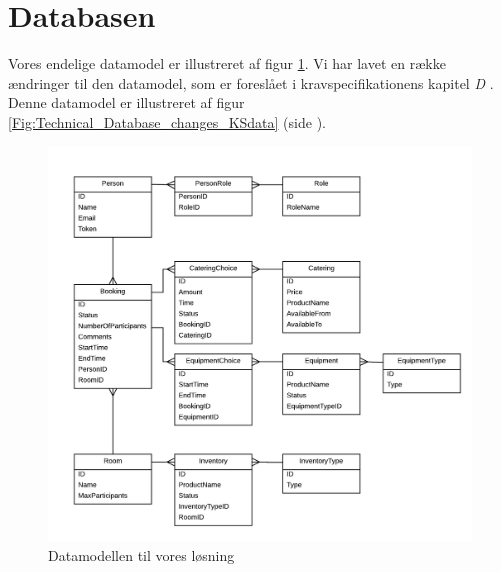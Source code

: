 \section{Databasen}
\label{Technical_Database}
Vores endelige datamodel er illustreret af figur \ref{Fig:Technical_Database_datamodel}. Vi har lavet en række ændringer til den datamodel, som er foreslået i kravspecifikationens kapitel \textit{D} \cite[s.14]{kravspec}. Denne datamodel er illustreret af figur \ref{Fig:Technical_Database_changes_KSdata} (side \pageref{Fig:Technical_Database_changes_KSdata}).

\begin{figure}[h!]
  \centering
    \includegraphics[width=\textwidth]{Chapters/Design/Technical/Images/OurDataModel}
  \caption{Datamodellen til vores løsning}
\label{Fig:Technical_Database_datamodel}
\end{figure}

